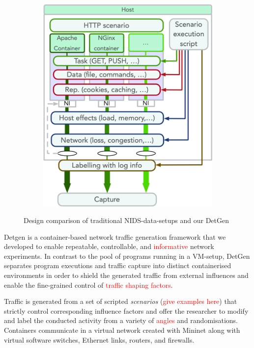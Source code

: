 \documentclass[sigconf]{acmart}
\begin{document}
\begin{figure}
\begin{subfigure}[b]{0.4\textwidth}
\includegraphics[width=\textwidth]{images/Docker_setup_final.png}
\end{subfigure}
\caption{Design comparison of traditional NIDS-data-setups and our DetGen }
\end{figure}

Detgen is a container-based network traffic generation framework that we developed to enable repeatable, controllable, and \textcolor{red}{informative} network experiments. In contrast to the pool of programs running in a VM-setup, DetGen separates program executions and traffic capture into distinct containerised environments in order to shield the generated traffic from external influences and enable the fine-grained control of \textcolor{red}{traffic shaping factors}.

Traffic is generated from a set of scripted \textit{scenarios} (\textcolor{red}{give examples here}) that strictly control corresponding influence factors and offer the researcher to modify and label the conducted activity from a variety of \textcolor{red}{angles} and randomisations. Containers communicate in a virtual network created with Mininet along with virtual software switches, Ethernet links, routers, and firewalls. %
\end{document}
